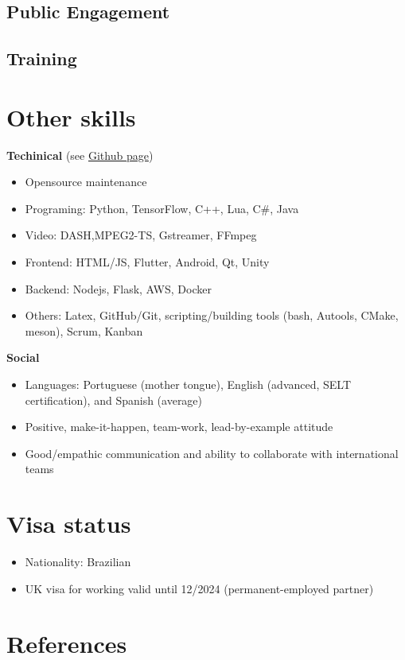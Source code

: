 \documentclass[10pt,a4paper,sans,colorlinks]{moderncv}
\begin{document}
\subsection{Public Engagement}
  
\subsection{Training}

\section{Other skills}

\textbf{Techinical} (see \href{https://github.com/alanlivio}{Github page})
  \begin{itemize}[mynosep]
    \item Opensource maintenance
    \item Programing: Python, TensorFlow, C++, Lua, C\#, Java
    \item Video: DASH,MPEG2-TS, Gstreamer, FFmpeg
    \item Frontend: HTML/JS, Flutter, Android, Qt, Unity
    \item Backend: Nodejs, Flask, AWS, Docker
    \item Others: Latex, GitHub/Git, scripting/building tools (bash, Autools, CMake, meson), Scrum, Kanban
  \end{itemize}
  
\textbf{Social}
  \begin{itemize}[mynosep]
    \item Languages: Portuguese (mother tongue), English (advanced, SELT certification), and Spanish (average)
    \item Positive, make-it-happen, team-work, lead-by-example attitude
    \item Good/empathic communication and ability to collaborate with international teams
  \end{itemize}

\section{Visa status}
  \begin{itemize}[mynosep]
    \item Nationality: Brazilian
    \item UK visa for working valid until 12/2024 (permanent-employed partner)
  \end{itemize}

\section{References}


\end{document}
